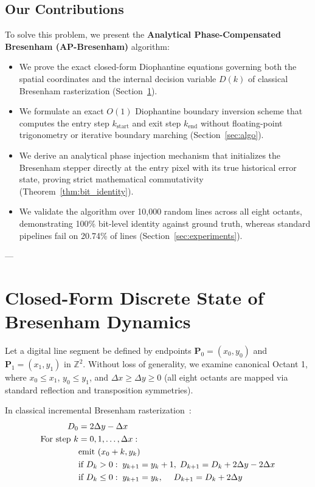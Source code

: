 \documentclass[runningheads]{llncs}
\begin{document}
\subsection{Our Contributions}
To solve this problem, we present the \textbf{Analytical Phase-Compensated Bresenham (AP-Bresenham)} algorithm:
\begin{itemize}
    \item We prove the exact closed-form Diophantine equations governing both the spatial coordinates and the internal decision variable $D(k)$ of classical Bresenham rasterization (Section~\ref{sec:math}).
    \item We formulate an exact $O(1)$ Diophantine boundary inversion scheme that computes the entry step $k_{\mathrm{start}}$ and exit step $k_{\mathrm{end}}$ without floating-point trigonometry or iterative boundary marching (Section~\ref{sec:algo}).
    \item We derive an analytical phase injection mechanism that initializes the Bresenham stepper directly at the entry pixel with its true historical error state, proving strict mathematical commutativity (Theorem~\ref{thm:bit_identity}).
    \item We validate the algorithm over 10,000 random lines across all eight octants, demonstrating 100\% bit-level identity against ground truth, whereas standard pipelines fail on 20.74\% of lines (Section~\ref{sec:experiments}).
\end{itemize}

---

\section{Closed-Form Discrete State of Bresenham Dynamics}
\label{sec:math}

Let a digital line segment be defined by endpoints $\mathbf{P}_0 = (x_0, y_0)$ and $\mathbf{P}_1 = (x_1, y_1)$ in $\mathbb{Z}^2$. Without loss of generality, we examine canonical Octant 1, where $x_0 \le x_1$, $y_0 \le y_1$, and $\Delta x \ge \Delta y \ge 0$ (all eight octants are mapped via standard reflection and transposition symmetries).

In classical incremental Bresenham rasterization~\cite{bresenham1965algorithm}:
\begin{align}
    D_0 &= 2\Delta y - \Delta x \\
    \text{For step } k &= 0, 1, \dots, \Delta x: \notag \\
    &\text{emit } (x_0 + k, y_k) \notag \\
    &\text{if } D_k > 0: \; y_{k+1} = y_k + 1, \; D_{k+1} = D_k + 2\Delta y - 2\Delta x \\
    &\text{if } D_k \le 0: \; y_{k+1} = y_k, \quad \; D_{k+1} = D_k + 2\Delta y
\end{align}
\end{document}

